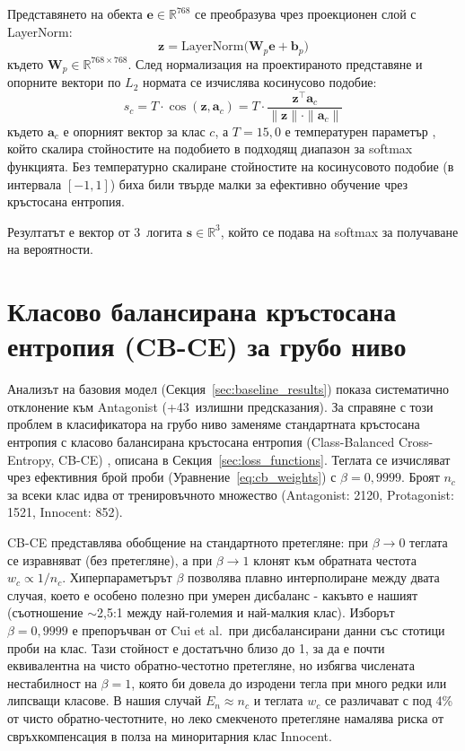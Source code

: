\documentclass[12pt,a4paper]{report}
\begin{document}
Представянето на обекта $\mathbf{e} \in \mathbb{R}^{768}$ се преобразува чрез проекционен слой с LayerNorm:
\begin{equation}
  \mathbf{z} = \text{LayerNorm}\bigl(\mathbf{W}_p \mathbf{e} + \mathbf{b}_p\bigr)
  \label{eq:projection}
\end{equation}
където $\mathbf{W}_p \in \mathbb{R}^{768 \times 768}$. След нормализация на проектираното представяне и опорните вектори по $L_2$ нормата се изчислява косинусово подобие:
\begin{equation}
  s_c = T \cdot \cos(\mathbf{z}, \mathbf{a}_c) = T \cdot \frac{\mathbf{z}^\top \mathbf{a}_c}{\|\mathbf{z}\| \cdot \|\mathbf{a}_c\|}
  \label{eq:cosine_sim}
\end{equation}
където $\mathbf{a}_c$ е опорният вектор за клас $c$, а $T = 15{,}0$ е температурен параметър \cite{guo2017calibration}, който скалира стойностите на подобието в подходящ диапазон за softmax функцията. Без температурно скалиране стойностите на косинусовото подобие (в интервала $[-1, 1]$) биха били твърде малки за ефективно обучение чрез кръстосана ентропия.

Резултатът е вектор от 3~логита $\mathbf{s} \in \mathbb{R}^{3}$, който се подава на softmax за получаване на вероятности.


\section{Класово балансирана кръстосана ентропия (CB-CE) за грубо ниво}
\label{sec:coarse_cbce}

Анализът на базовия модел (Секция~\ref{sec:baseline_results}) показа систематично отклонение към Antagonist (+43~излишни предсказания). За справяне с този проблем в класификатора на грубо ниво заменяме стандартната кръстосана ентропия с класово балансирана кръстосана ентропия (Class-Balanced Cross-Entropy, CB-CE) \cite{cui2019classbalanced}, описана в Секция~\ref{sec:loss_functions}. Теглата се изчисляват чрез ефективния брой проби (Уравнение~\ref{eq:cb_weights}) с $\beta=0{,}9999$. Броят $n_c$ за всеки клас идва от тренировъчното множество (Antagonist: 2120, Protagonist: 1521, Innocent: 852).

CB-CE представлява обобщение на стандартното претегляне: при $\beta \to 0$ теглата се изравняват (без претегляне), а при $\beta \to 1$ клонят към обратната честота $w_c \propto 1/n_c$. Хиперпараметърът $\beta$ позволява плавно интерполиране между двата случая, което е особено полезно при умерен дисбаланс - какъвто е нашият (съотношение $\sim$2{,}5:1 между най-големия и най-малкия клас). Изборът $\beta=0{,}9999$ е препоръчван от Cui et al.\ при дисбалансирани данни със стотици проби на клас. Тази стойност е достатъчно близо до 1, за да е почти еквивалентна на чисто обратно-честотно претегляне, но избягва числената нестабилност на $\beta=1$, която би довела до изродени тегла при много редки или липсващи класове. В нашия случай $E_n \approx n_c$ и теглата $w_c$ се различават с под 4\% от чисто обратно-честотните, но леко смекченото претегляне намалява риска от свръхкомпенсация в полза на миноритарния клас Innocent.
\end{document}
